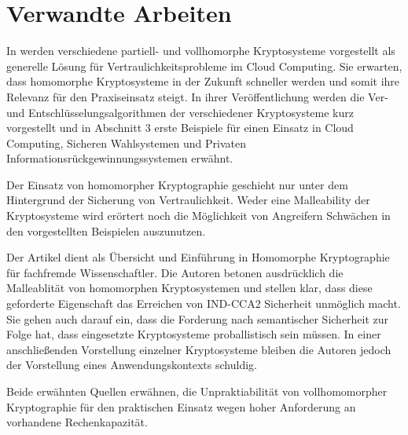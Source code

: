 \chapter{Verwandte Arbeiten}
In \cite{maimut2012homomorphic} werden verschiedene partiell- und vollhomorphe Kryptosysteme vorgestellt als generelle Lösung für Vertraulichkeitsprobleme im Cloud Computing. Sie erwarten, dass homomorphe Kryptosysteme in der Zukunft schneller werden und somit ihre Relevanz für den Praxiseinsatz steigt. In ihrer Veröffentlichung werden die Ver- und Entschlüsselungsalgorithmen der verschiedener Kryptosysteme kurz vorgestellt und in Abschnitt 3 erste Beispiele für einen Einsatz in Cloud Computing, Sicheren Wahlsystemen und Privaten Informationsrückgewinnungssystemen erwähnt.

Der Einsatz von homomorpher Kryptographie geschieht nur unter dem Hintergrund der Sicherung von Vertraulichkeit. Weder eine Malleability der Kryptosysteme wird erörtert noch die Möglichkeit von Angreifern Schwächen in den vorgestellten Beispielen auszunutzen.

Der Artikel \cite{fontaine2007survey} dient als Übersicht und Einführung in Homomorphe Kryptographie für fachfremde Wissenschaftler. Die Autoren betonen ausdrücklich die Malleablität von homomorphen Kryptosystemen und stellen klar, dass diese geforderte Eigenschaft das Erreichen von IND-CCA2 Sicherheit unmöglich macht. Sie gehen auch darauf ein, dass die Forderung nach semantischer Sicherheit zur Folge hat, dass eingesetzte Kryptosysteme proballistisch sein müssen.
In einer anschließenden Vorstellung einzelner Kryptosysteme bleiben die Autoren jedoch der Vorstellung eines Anwendungskontexts schuldig.

Beide erwähnten Quellen erwähnen, die Unpraktiabilität von vollhomomorpher Kryptographie für den praktischen Einsatz wegen hoher Anforderung an vorhandene Rechenkapazität.